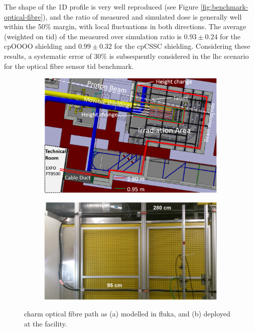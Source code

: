 \documentclass[encoding=utf8,british]{tumphthesis}
\begin{document}
The shape of the 1D profile is very well reproduced (see Figure \ref{fig:benchmark-optical-fibre}), and the ratio of measured and simulated dose is generally well within the 50\% margin, with local fluctuations in both directions.  The average (weighted on \acrshort{tid}) of the measured over simulation ratio is $0.93\pm0.24$ for the cpOOOO shielding and $0.99\pm0.32$ for the cpCSSC shielding. Considering these results, a systematic error of 30\% is subsequently considered in the \acrshort{lhc} scenario for the optical fibre sensor \acrshort{tid} benchmark.



\begin{figure}[H]
    \centering
    \begin{subfigure}{0.45\textwidth}
      \includegraphics[width=\linewidth]{figures/CHARM_FLUKA_geometry_OF.png}
      \caption{}
      \label{fig:CHARM-OF-FLUKA-geometry}
    \end{subfigure}
    \hfil %
    \begin{subfigure}{0.53\textwidth}
      \includegraphics[width=\linewidth]{figures/CHARM_real_cable.png}
      \caption{}
      \label{fig:CHARM-real-OF-cable}
    \end{subfigure}

    \caption{\acrshort{charm} optical fibre path as (a) modelled in \acrshort{fluka}, and (b) deployed at the facility. \cite{Toccafondo:2221650}}
    \label{fig:CHARM-optical-fibre-geometry}
\end{figure}
\end{document}

